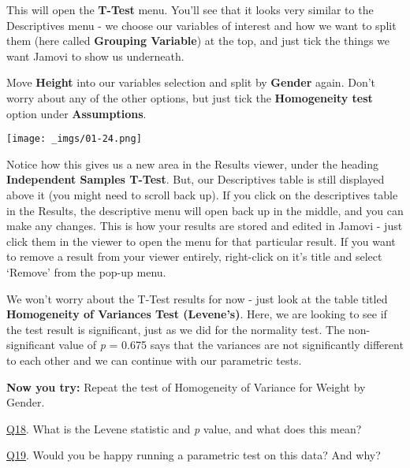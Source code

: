 \documentclass[
  letterpaper,
  DIV=11,
  numbers=noendperiod]{scrartcl}
\begin{document}
This will open the \textbf{T-Test} menu. You'll see that it looks very
similar to the Descriptives menu - we choose our variables of interest
and how we want to split them (here called \textbf{Grouping Variable})
at the top, and just tick the things we want Jamovi to show us
underneath.

Move \textbf{Height} into our variables selection and split by
\textbf{Gender} again. Don't worry about any of the other options, but
just tick the \textbf{Homogeneity test} option under
\textbf{Assumptions}.

\texttt{[image: \_imgs/01-24.png]}

Notice how this gives us a new area in the Results viewer, under the
heading \textbf{Independent Samples T-Test}. But, our Descriptives table
is still displayed above it (you might need to scroll back up). If you
click on the descriptives table in the Results, the descriptive menu
will open back up in the middle, and you can make any changes. This is
how your results are stored and edited in Jamovi - just click them in
the viewer to open the menu for that particular result. If you want to
remove a result from your viewer entirely, right-click on it's title and
select `Remove' from the pop-up menu.

We won't worry about the T-Test results for now - just look at the table
titled \textbf{Homogeneity of Variances Test (Levene's)}. Here, we are
looking to see if the test result is significant, just as we did for the
normality test. The non-significant value of \emph{p} = 0.675 says that
the variances are not significantly different to each other and we can
continue with our parametric tests.

\textbf{Now you try:} Repeat the test of Homogeneity of Variance for
Weight by Gender.

\begin{tcolorbox}[beforeafter skip=1cm, ignore nobreak=true, breakable, colframe=Questions-frame, colback=Questions-bg, coltext=Questions-text, boxsep=2mm, arc=0mm, boxrule=0.5mm]

\protect\hypertarget{Q18}{\protect\hyperlink{A18}{Q18}}. What is the
Levene statistic and \emph{p} value, and what does this mean?

\protect\hypertarget{Q19}{\protect\hyperlink{A19}{Q19}}. Would you be
happy running a parametric test on this data? And why?

\end{tcolorbox}

\newpage{}
\end{document}
